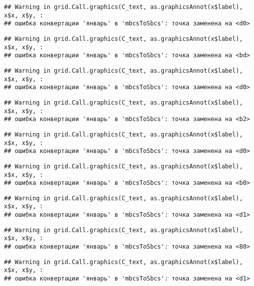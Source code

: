 \documentclass[
]{article}
\begin{document}
\begin{verbatim}
## Warning in grid.Call.graphics(C_text, as.graphicsAnnot(x$label), x$x, x$y, :
## ошибка конвертации 'январь' в 'mbcsToSbcs': точка заменена на <d0>
\end{verbatim}

\begin{verbatim}
## Warning in grid.Call.graphics(C_text, as.graphicsAnnot(x$label), x$x, x$y, :
## ошибка конвертации 'январь' в 'mbcsToSbcs': точка заменена на <bd>
\end{verbatim}

\begin{verbatim}
## Warning in grid.Call.graphics(C_text, as.graphicsAnnot(x$label), x$x, x$y, :
## ошибка конвертации 'январь' в 'mbcsToSbcs': точка заменена на <d0>
\end{verbatim}

\begin{verbatim}
## Warning in grid.Call.graphics(C_text, as.graphicsAnnot(x$label), x$x, x$y, :
## ошибка конвертации 'январь' в 'mbcsToSbcs': точка заменена на <b2>
\end{verbatim}

\begin{verbatim}
## Warning in grid.Call.graphics(C_text, as.graphicsAnnot(x$label), x$x, x$y, :
## ошибка конвертации 'январь' в 'mbcsToSbcs': точка заменена на <d0>
\end{verbatim}

\begin{verbatim}
## Warning in grid.Call.graphics(C_text, as.graphicsAnnot(x$label), x$x, x$y, :
## ошибка конвертации 'январь' в 'mbcsToSbcs': точка заменена на <b0>
\end{verbatim}

\begin{verbatim}
## Warning in grid.Call.graphics(C_text, as.graphicsAnnot(x$label), x$x, x$y, :
## ошибка конвертации 'январь' в 'mbcsToSbcs': точка заменена на <d1>
\end{verbatim}

\begin{verbatim}
## Warning in grid.Call.graphics(C_text, as.graphicsAnnot(x$label), x$x, x$y, :
## ошибка конвертации 'январь' в 'mbcsToSbcs': точка заменена на <80>
\end{verbatim}

\begin{verbatim}
## Warning in grid.Call.graphics(C_text, as.graphicsAnnot(x$label), x$x, x$y, :
## ошибка конвертации 'январь' в 'mbcsToSbcs': точка заменена на <d1>
\end{verbatim}
\end{document}

